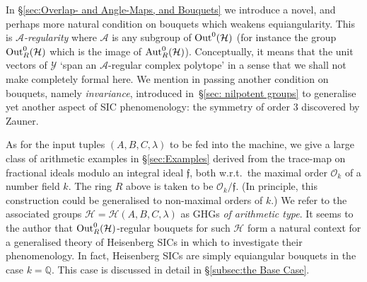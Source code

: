 \documentclass[12pt]{article}
\newcounter{example}[section]
\newcommand{\Aut}{{\rm Aut}}
\newcommand{\bbQ}{\ensuremath{\mathbb{Q}}}
\newcommand{\cA}{\ensuremath{\mathcal{A}}}
\newcommand{\cH}{\ensuremath{\mathcal{H}}}
\newcommand{\cO}{\ensuremath{\mathcal{O}}}
\newcommand{\cY}{\ensuremath{\mathcal{Y}}}
\newcommand{\ff}{\ensuremath{\mathfrak{f}}}
\newcommand{\Out}{{\rm Out}}
\newcommand{\Hei}[4]{\cH({#1},{#2},{#3},{#4})}
\newcommand{\HeiStan}{\Hei{A}{B}{C}{\lambda}}
\begin{document}
In \S\ref{sec:Overlap- and Angle-Maps, and Bouquets} we introduce a novel, and perhaps more natural condition on bouquets which weakens equiangularity. This is  \textit{$\cA$-regularity} where $\cA$ is any subgroup of $\Out^0(\cH)$ (for instance the group $\Out^0_R(\cH)$ which is the image of $\Aut^0_R(\cH)$). Conceptually, it means that the unit vectors of $\cY$ `span an $\cA$-regular complex polytope' in a sense that we shall not make completely formal here. 
We mention in passing another condition on bouquets, namely \textit{invariance}, introduced in~\S\ref{sec: nilpotent groups} to generalise yet another aspect of SIC phenomenology: the symmetry of order $3$ discovered by Zauner.    

As for the input tuples $(A,B,C,\lambda)$ to be fed into the machine, we give a large class of arithmetic examples in \S\ref{sec:Examples} derived from the trace-map on fractional ideals modulo an integral ideal $\ff$, both w.r.t.\ the maximal order $\cO_k$ of a number field $k$. The ring $R$ above is taken to be $\cO_k/\ff$. (In principle, this construction could be generalised to non-maximal orders of $k$.) We refer to the associated groups $\cH=\cH(A,B,C,\lambda)$ as GHGs \textit{of arithmetic type}. It seems to the author that $\Out^0_R(\cH)$-regular bouquets for such $\cH$ form a natural context for a generalised theory of Heisenberg SICs in which to investigate their phenomenology. In fact, Heisenberg SICs are simply equiangular bouquets in the case $k=\bbQ$. This case is discussed in detail in \S\ref{subsec:the Base Case}.
\end{document}
